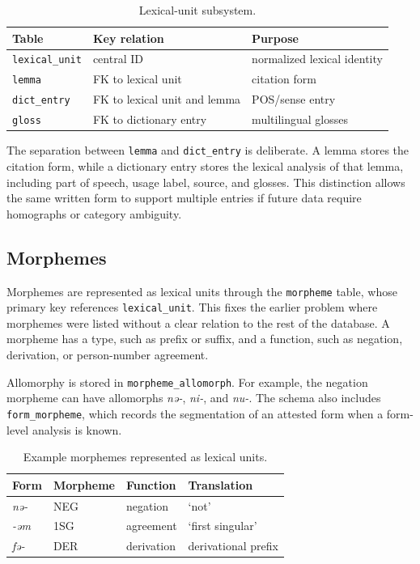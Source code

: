 \documentclass[11pt]{article}
\begin{document}
\begin{table}[t]
\centering
\small
\begin{tabular}{lll}
\toprule
Table & Key relation & Purpose \\
\midrule
\texttt{lexical\_unit} & central ID & normalized lexical identity \\
\texttt{lemma} & FK to lexical unit & citation form \\
\texttt{dict\_entry} & FK to lexical unit and lemma & POS/sense entry \\
\texttt{gloss} & FK to dictionary entry & multilingual glosses \\
\bottomrule
\end{tabular}
\caption{Lexical-unit subsystem.}
\label{tab:lexical-subsystem}
\end{table}

The separation between \texttt{lemma} and \texttt{dict\_entry} is deliberate. A lemma stores the citation form, while a dictionary entry stores the lexical analysis of that lemma, including part of speech, usage label, source, and glosses. This distinction allows the same written form to support multiple entries if future data require homographs or category ambiguity.

\subsection{Morphemes}

Morphemes are represented as lexical units through the \texttt{morpheme} table, whose primary key references \texttt{lexical\_unit}. This fixes the earlier problem where morphemes were listed without a clear relation to the rest of the database. A morpheme has a type, such as prefix or suffix, and a function, such as negation, derivation, or person-number agreement.

Allomorphy is stored in \texttt{morpheme\_allomorph}. For example, the negation morpheme can have allomorphs \textit{nǝ-}, \textit{ni-}, and \textit{nu-}. The schema also includes \texttt{form\_morpheme}, which records the segmentation of an attested form when a form-level analysis is known.

\begin{table}[t]
\centering
\small
\begin{tabular}{llll}
\toprule
Form & Morpheme & Function & Translation \\
\midrule
\textit{nǝ-} & NEG & negation & `not' \\
\textit{-ǝm} & 1SG & agreement & `first singular' \\
\textit{fǝ-} & DER & derivation & derivational prefix \\
\bottomrule
\end{tabular}
\caption{Example morphemes represented as lexical units.}
\label{tab:morpheme-examples}
\end{table}
\end{document}
